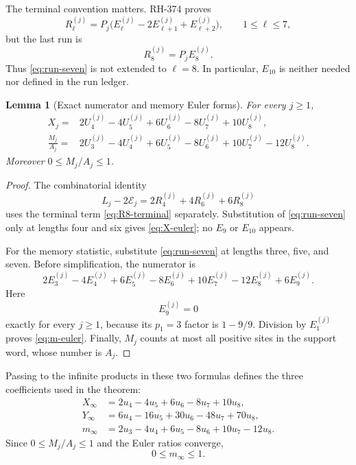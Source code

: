 \documentclass[11pt]{article}
\newtheorem{lemma}[theorem]{Lemma}
\theoremstyle{definition}
\theoremstyle{remark}
\newcommand{\Ecal}{\mathcal E}
\begin{document}
The terminal convention matters.  RH-374 proves \cite{RH374}
\begin{equation}
 R_\ell^{(j)}=P_j
 \bigl(E_\ell^{(j)}-2E_{\ell+1}^{(j)}+E_{\ell+2}^{(j)}\bigr),
 \qquad 1\le\ell\le7,
 \label{eq:run-seven}
\end{equation}
but the last run is
\begin{equation}
                         R_8^{(j)}=P_jE_8^{(j)}.
 \label{eq:R8-terminal}
\end{equation}
Thus \eqref{eq:run-seven} is not extended to $\ell=8$.  In particular,
$E_{10}$ is neither needed nor defined in the run ledger.

\begin{lemma}[Exact numerator and memory Euler forms]
For every $j\ge1$,
\begin{align}
 X_j={}&2U_4^{(j)}-4U_5^{(j)}+6U_6^{(j)}
        -8U_7^{(j)}+10U_8^{(j)},
 \label{eq:X-euler}\\
 \frac{M_j}{A_j}={}&2U_3^{(j)}-4U_4^{(j)}+6U_5^{(j)}
        -8U_6^{(j)}+10U_7^{(j)}-12U_8^{(j)}.
 \label{eq:m-euler}
\end{align}
Moreover $0\le M_j/A_j\le1$.
\end{lemma}

\begin{proof}
The combinatorial identity
\[
 L_j-2\Ecal_j=2R_4^{(j)}+4R_6^{(j)}+6R_8^{(j)}
\]
uses the terminal term \eqref{eq:R8-terminal} separately.  Substitution of
\eqref{eq:run-seven} only at lengths four and six gives
\eqref{eq:X-euler}; no $E_9$ or $E_{10}$ appears.

For the memory statistic, substitute \eqref{eq:run-seven} at lengths
three, five, and seven.  Before simplification, the numerator is
\[
 2E_3^{(j)}-4E_4^{(j)}+6E_5^{(j)}-8E_6^{(j)}
 +10E_7^{(j)}-12E_8^{(j)}+6E_9^{(j)}.
\]
Here
\[
 E_9^{(j)}=0
\]
exactly for every $j\ge1$, because its $p_1=3$ factor is $1-9/9$.
Division by $E_1^{(j)}$ proves \eqref{eq:m-euler}.  Finally, $M_j$ counts
at most all positive sites in the support word, whose number is $A_j$.
\end{proof}

Passing to the infinite products in these two formulas defines the three
coefficients used in the theorem:
\begin{align}
 X_\infty&=2u_4-4u_5+6u_6-8u_7+10u_8,
 \label{eq:Xinf}\\
 Y_\infty&=6u_4-16u_5+30u_6-48u_7+70u_8,
 \label{eq:Yinf}\\
 m_\infty&=2u_3-4u_4+6u_5-8u_6+10u_7-12u_8.
 \label{eq:minf}
\end{align}
Since $0\le M_j/A_j\le1$ and the Euler ratios converge,
\begin{equation}
                         0\le m_\infty\le1.
 \label{eq:minf-site}
\end{equation}
\end{document}
